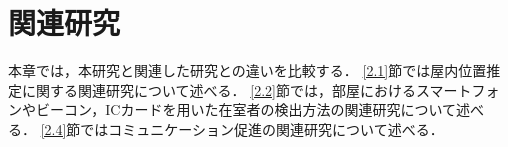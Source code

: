 \chapter{関連研究}\label{2}

本章では，本研究と関連した研究との違いを比較する．
\ref{2.1}節では屋内位置推定に関する関連研究について述べる．
\ref{2.2}節では，部屋におけるスマートフォンやビーコン，ICカードを用いた在室者の検出方法の関連研究について述べる．
\ref{2.4}節ではコミュニケーション促進の関連研究について述べる．



% 



